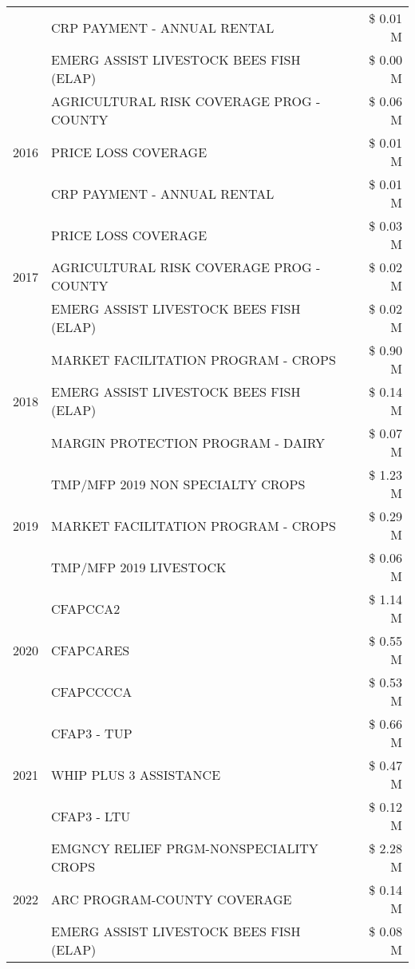 \begin{tabular}{llr}
 & CRP PAYMENT - ANNUAL RENTAL & \$ 0.01 M \\
 & EMERG ASSIST LIVESTOCK BEES FISH (ELAP) & \$ 0.00 M \\
\cline{1-3}
\multirow[t]{3}{*}{2016} & AGRICULTURAL RISK COVERAGE PROG - COUNTY & \$ 0.06 M \\
 & PRICE LOSS COVERAGE & \$ 0.01 M \\
 & CRP PAYMENT - ANNUAL RENTAL & \$ 0.01 M \\
\cline{1-3}
\multirow[t]{3}{*}{2017} & PRICE LOSS COVERAGE & \$ 0.03 M \\
 & AGRICULTURAL RISK COVERAGE PROG - COUNTY & \$ 0.02 M \\
 & EMERG ASSIST LIVESTOCK BEES FISH (ELAP) & \$ 0.02 M \\
\cline{1-3}
\multirow[t]{3}{*}{2018} & MARKET FACILITATION PROGRAM - CROPS & \$ 0.90 M \\
 & EMERG ASSIST LIVESTOCK BEES FISH (ELAP) & \$ 0.14 M \\
 & MARGIN PROTECTION PROGRAM - DAIRY & \$ 0.07 M \\
\cline{1-3}
\multirow[t]{3}{*}{2019} & TMP/MFP 2019 NON SPECIALTY CROPS & \$ 1.23 M \\
 & MARKET FACILITATION PROGRAM - CROPS & \$ 0.29 M \\
 & TMP/MFP 2019 LIVESTOCK & \$ 0.06 M \\
\cline{1-3}
\multirow[t]{3}{*}{2020} & CFAPCCA2 & \$ 1.14 M \\
 & CFAPCARES & \$ 0.55 M \\
 & CFAPCCCCA & \$ 0.53 M \\
\cline{1-3}
\multirow[t]{3}{*}{2021} & CFAP3 - TUP & \$ 0.66 M \\
 & WHIP PLUS 3 ASSISTANCE & \$ 0.47 M \\
 & CFAP3 - LTU & \$ 0.12 M \\
\cline{1-3}
\multirow[t]{3}{*}{2022} & EMGNCY RELIEF PRGM-NONSPECIALITY CROPS & \$ 2.28 M \\
 & ARC PROGRAM-COUNTY COVERAGE & \$ 0.14 M \\
 & EMERG ASSIST LIVESTOCK BEES FISH (ELAP) & \$ 0.08 M \\
\cline{1-3}
\bottomrule
\end{tabular}
